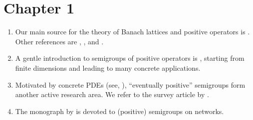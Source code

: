 \setcounter{section}{0}
\notesheaderthree
\thispagestyle{empty}
\section*{Chapter 1}
\begin{enumerate}

\item 
Our main source for the theory of Banach lattices and positive operators is \textcite{zbmath03464348}.
Other %
references are \textcite{zbmath03983937}, \textcite{zbmath00051953}, and \textcite{zbmath00967648}.

\item
A gentle introduction to  semigroups of positive operators is \textcite{zbmath06695787}, starting from finite dimensions and leading to many concrete applications.

\item
Motivated by concrete PDEs (see, \eg \textcite{zbmath06487326}), \enquote{eventually positive} semigroups form another active research area.
We refer to the survey article by \textcite{zbmath07497413}.

\item 
The monograph by \textcite{zbmath06255542} is devoted to (positive) semigroups on networks.


\end{enumerate}
